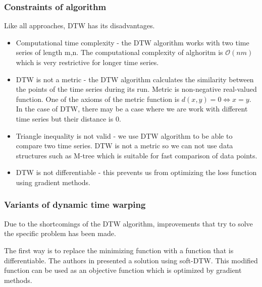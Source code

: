 \documentclass[thesis=M,english]{FITthesis}[2019/12/23]
\begin{document}

\newpage
\subsubsection{Constraints of algorithm}
Like all approaches, DTW has its disadvantages.
\begin{itemize}
		\item Computational time complexity - the DTW algorithm works with two time series of length m,n. The computational complexity of alghoritm is $\mathcal{O}(nm)$ which is very restrictive for longer time series.
		\item DTW is not a metric - the DTW algorithm calculates the similarity between the points of the time series during its run. Metric is non-negative real-valued function. One of the axioms of the metric function is $d(x,y) = 0 \Longleftrightarrow x = y$. In the case of DTW, there may be a case where we are work with different time series but their distance is 0.
		\item Triangle inequality is not valid - we use DTW algorithm to be able to compare two time series. DTW is not a metric so we can not use data structures such as M-tree which is suitable for fast comparison of data points.
		\item DTW is not differentiable - this prevents us from optimizing the loss function using gradient methods.
	\end{itemize}


\subsubsection{Variants of dynamic time warping}
Due to the shortcomings of the DTW algorithm, improvements that try to solve the specific problem has been made.

The first way is to replace the minimizing function with a function that is differentiable. The authors in \cite{soft-DTW} presented a solution using soft-DTW. This modified function can be used as an objective function which is optimized by gradient methods.
\end{document}
